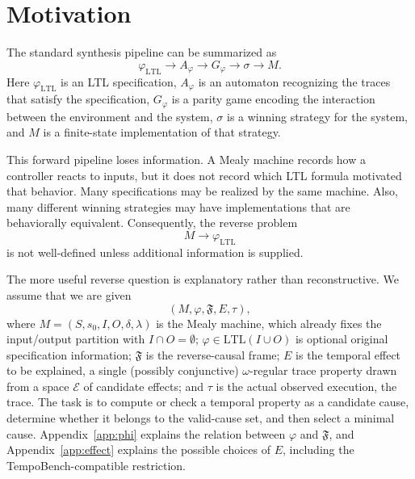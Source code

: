 \documentclass[11pt]{article}
\theoremstyle{remark}
\newcommand{\Effects}{\mathcal{E}}
\newcommand{\LTL}{\mathrm{LTL}}
\newcommand{\Frame}{\mathfrak{F}}
\begin{document}
\section{Motivation}

The standard synthesis pipeline can be summarized as
\[
  \varphi_{\LTL}
  \longrightarrow
  A_{\varphi}
  \longrightarrow
  G_{\varphi}
  \longrightarrow
  \sigma
  \longrightarrow
  M .
\]
Here \(\varphi_{\LTL}\) is an LTL specification, \(A_{\varphi}\) is an
automaton recognizing the traces that satisfy the specification,
\(G_{\varphi}\) is a parity game encoding the interaction between the
environment and the system, \(\sigma\) is a winning strategy for the system,
and \(M\) is a finite-state implementation of that strategy.

This forward pipeline loses information. A Mealy machine records how a
controller reacts to inputs, but it does not record which LTL formula motivated
that behavior. Many specifications may be realized by the same machine. Also,
many different winning strategies may have implementations that are
behaviorally equivalent. Consequently, the reverse problem
\[
  M \longrightarrow \varphi_{\LTL}
\]
is not well-defined unless additional information is supplied.

The more useful reverse question is explanatory rather than reconstructive. We
assume that we are given
\[
  (M,\varphi,\Frame,E,\tau),
\]
where \(M=(S,s_0,I,O,\delta,\lambda)\) is the Mealy machine, which already fixes
the input/output partition with \(I\cap O=\emptyset\); \(\varphi\in\LTL(I\cup O)\)
is optional original specification information; \(\Frame\) is the reverse-causal
frame; \(E\) is the temporal effect to be explained, a single (possibly
conjunctive) \(\omega\)-regular trace property drawn from a space \(\Effects\) of
candidate effects; and \(\tau\) is the actual
observed execution, the trace. The task is to compute or check a temporal property as a
candidate cause, determine whether it belongs to the valid-cause set, and then
select a minimal cause. Appendix~\ref{app:phi} explains the relation
between \(\varphi\) and \(\Frame\), and Appendix~\ref{app:effect} explains the
possible choices of \(E\), including the TempoBench-compatible restriction.
\end{document}
